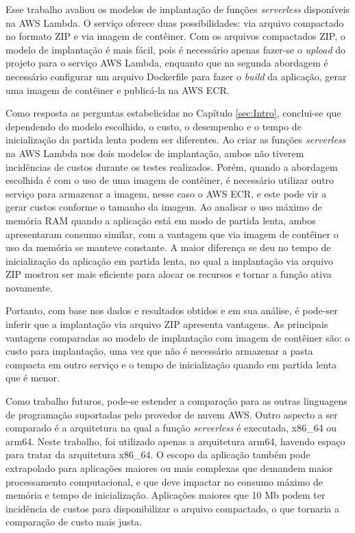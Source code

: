 \documentclass[conference]{IEEEtran}
\begin{document}
Esse trabalho avaliou os modelos de implantação de funções \textit{serverless} disponíveis na AWS Lambda. O serviço oferece duas possibilidades: via arquivo compactado no formato ZIP e via imagem de contêiner. Com os arquivos compactados ZIP, o modelo de implantação é mais fácil, pois é necessário apenas fazer-se o \textit{upload} do projeto para o serviço AWS Lambda, enquanto que na segunda abordagem é necessário configurar um arquivo Dockerfile para fazer o \textit{build} da aplicação, gerar uma imagem de contêiner e publicá-la na AWS ECR.

Como resposta as perguntas estabelicidas no Capítulo \ref{sec:Intro}, conclui-se que dependendo do modelo escolhido, o custo, o desempenho e o tempo de inicialização da partida lenta podem ser diferentes.
Ao criar as funções \textit{serverless} na AWS Lambda nos dois modelos de implantação, ambos não tiverem incidências de custos durante os testes realizados. Porém, quando a abordagem escolhida é com o uso de uma imagem de contêiner, é necessário utilizar outro serviço para armazenar a imagem, nesse caso o AWS ECR, e este pode vir a gerar custos conforme o tamanho da imagem. Ao analisar o uso máximo de memória RAM quando a aplicação está em modo de partida lenta, ambos apresentaram consumo similar, com a vantagem que via imagem de contêiner o uso da memória se manteve constante. A maior diferença se deu no tempo de inicialização da aplicação em partida lenta, no qual a implantação via arquivo ZIP mostrou ser mais eficiente para alocar os recursos e tornar a função ativa novamente.

Portanto, com base nos dados e resultados obtidos e em sua análise, é pode-ser inferir que a implantação via arquivo ZIP apresenta vantagens. As principais vantagens comparadas ao modelo de implantação com imagem de contêiner são: o custo para implantação, uma vez que não é necessário armazenar a pasta compacta em outro serviço e o tempo de inicialização quando em partida lenta que é menor.  

Como trabalho futuros, pode-se estender a comparação para as outras linguagens de programação suportadas pelo provedor de nuvem AWS. Outro aspecto a ser comparado é a arquitetura na qual a função \textit{serverless} é executada, x86\_64 ou arm64. Neste trabalho, foi utilizado apenas a arquitetura arm64, havendo espaço para tratar da arquitetura x86\_64. O escopo da aplicação também pode extrapolado para aplicações maiores ou mais complexas que demandem maior processamento computacional, e que deve impactar no consumo máximo de memória e tempo de inicialização. Aplicações maiores que 10 Mb podem ter incidência de custos para disponibilizar o arquivo compactado, o que tornaria a comparação de custo mais justa.




\end{document}
